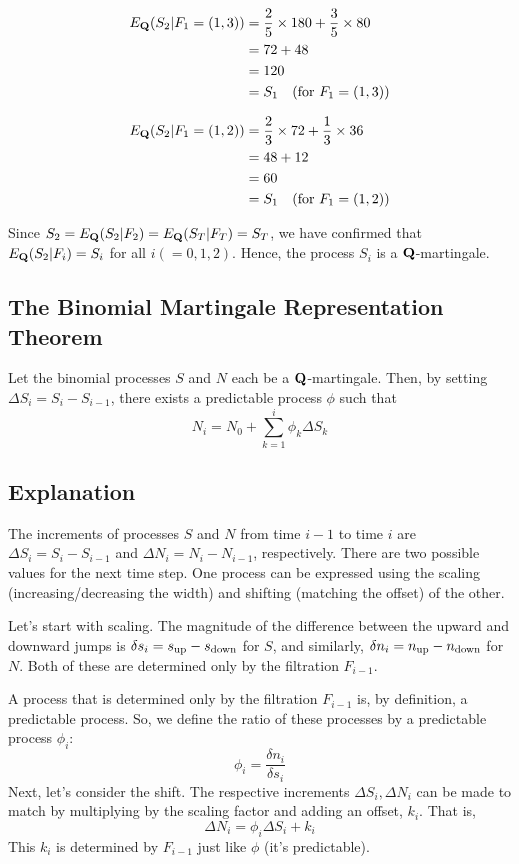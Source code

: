\documentclass[uplatex,a4j,12pt,dvipdfmx]{jsarticle}
\begin{document}
\begin{align*}
E_{\bf Q}( S_{2} | F_1=(1,3) ) &= \frac{2}{5} \times 180 + \frac{3}{5} \times 80 \\
&= 72 + 48 \\
&= 120 \\
&= S_{1} \quad (\text{for } F_{1} = (1,3))
\end{align*}

\begin{align*}
E_{\bf Q}( S_{2} | F_1=(1,2) ) &= \frac{2}{3} \times 72 + \frac{1}{3} \times 36 \\
&= 48+12 \\
&= 60 \\
&= S_{1} \quad (\text{for } F_{1} = (1,2))
\end{align*}

Since $S_{2} = E_{\bf Q}( S_{2} | F_2 ) = E_{\bf Q}( S_{T} | F_{T} ) = S_{T}$, we have confirmed that $E_{\bf Q}( S_{2} | F_i ) = S_{i}$ for all $i(=0,1,2)$. Hence, the process $S_{i}$ is a ${\bf Q}$-martingale.

\subsection{The Binomial Martingale Representation Theorem}
Let the binomial processes $S$ and $N$ each be a ${\bf Q}$-martingale. Then, by setting $\Delta S_{i} = S_{i} - S_{i-1}$, there exists a predictable process $\phi$ such that \[N_{i} = N_{0} + \sum^{i}_{k=1} \phi_{k} \Delta S_{k}\]

\subsection{Explanation}
The increments of processes $S$ and $N$ from time $i-1$ to time $i$ are $\Delta S_{i} = S_{i} - S_{i-1}$ and $\Delta N_{i} = N_{i} - N_{i-1}$, respectively. There are two possible values for the next time step. One process can be expressed using the scaling (increasing/decreasing the width) and shifting (matching the offset) of the other.

Let's start with scaling. The magnitude of the difference between the upward and downward jumps is $\delta s_{i} = s_{\rm up} - s_{\rm down}$ for $S$, and similarly, $\delta n_{i} = n_{\rm up} - n_{\rm down}$ for $N$. Both of these are determined only by the filtration $F_{i-1}$.

A process that is determined only by the filtration $F_{i-1}$ is, by definition, a predictable process. So, we define the ratio of these processes by a predictable process $\phi_{i}$: \[\phi_{i} = \frac{\delta n_{i}}{\delta s_{i}}\] Next, let's consider the shift. The respective increments $\Delta S_{i} , \Delta N_{i}$ can be made to match by multiplying by the scaling factor and adding an offset, $k_{i}$. That is, \[\Delta N_{i} = \phi_{i} \Delta S_{i} + k_{i}\] This $k_{i}$ is determined by $F_{i-1}$ just like $\phi$ (it's predictable).
\end{document}
